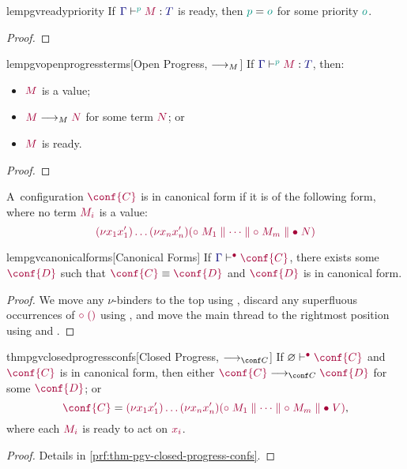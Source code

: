 \documentclass[main.tex]{subfiles}
\begin{document}
\begin{restatablelemma}{lempgvreadypriority}
  \label{lem:pgv-ready-priority}
  If $\tseq[\cs{p}]{\ty{\Gamma}}{M}{T}$ is ready, then $\cs{p}=\cs{o}$ for some priority $\cs{o}$.
\end{restatablelemma}
\begin{proof}
  \admit
\end{proof}

\begin{restatablelemma}{lempgvopenprogressterms}[Open Progress, $\longrightarrow_{M}$]
  \label{lem:pgv-open-progress-terms}
  If $\tseq[\cs{p}]{\ty{\Gamma}}{M}{T}$, then:
  \begin{itemize}
  \item $\tm{M}$ is a value;
  \item $\tm{M}\tred\tm{N}$ for some term $\tm{N}$; or
  \item $\tm{M}$ is ready.
  \end{itemize}
\end{restatablelemma}
\begin{proof}
  \admit
\end{proof}

\begin{definition}
  \label{def:pgv-canonical-forms}
  A~configuration $\tm{\conf{C}}$ is in canonical form if it is of the following form, where no term $\tm{M_i}$ is a value:
  \[
    \tm{\res{x_1}{x'_1}{\dots\res{x_n}{x'_n}{(\child\;M_1\parallel\dots\parallel\child\;M_m\parallel\main\;N)}}}
  \]
\end{definition}

\begin{restatablelemma}{lempgvcanonicalforms}[Canonical Forms]
  \label{lem:pgv-canonical-forms}
  If $\cseq[\main]{\ty{\Gamma}}{\conf{C}}$, there exists some $\tm{\conf{D}}$ such that $\tm{\conf{C}}\equiv\tm{\conf{D}}$ and $\tm{\conf{D}}$ is in canonical form.
\end{restatablelemma}
\begin{proof}
  We move any $\nu$-binders to the top using , discard any superfluous occurrences of $\tm{\child\;\unit}$ using , and move the main thread to the rightmost position using  and .
\end{proof}

\begin{restatabletheorem}{thmpgvclosedprogressconfs}[Closed Progress, $\cred$]
  \label{lem:pgv-closed-progress-confs}
  If $\cseq[\main]{\emptyenv}{\conf{C}}$ and $\tm{\conf{C}}$ is in canonical form, then either $\tm{\conf{C}}\cred\tm{\conf{D}}$ for some $\tm{\conf{D}}$; or
  \[
    \tm{\conf{C}}
    =
    \tm{\res{x_1}{x'_1}{\dots\res{x_n}{x'_n}{(\child\;M_1\parallel\dots\parallel\child\;M_m\parallel\main\;V)}}},
  \]
  where each $\tm{M_i}$ is ready to act on $\tm{x_i}$.
\end{restatabletheorem}
\begin{proof}
  Details in \cref{prf:thm-pgv-closed-progress-confs}.
\end{proof}
\end{document}
